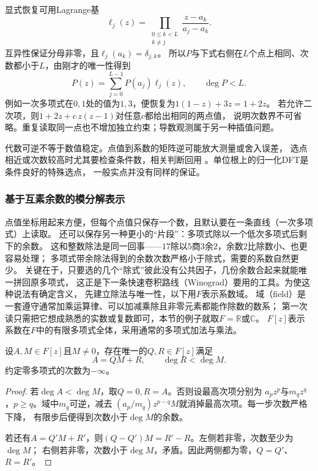 显式恢复可用Lagrange基
\[
  \ell_j(z)=\prod_{\substack{0\leq k<L\\k\neq j}}
  \frac{z-a_k}{a_j-a_k}.
\]
互异性保证分母非零，且$\ell_j(a_k)=\delta_{j,k}$。
所以$P$与下式右侧在$L$个点上相同、次数都小于$L$，由刚才的唯一性得到
\begin{equation}
  P(z)=\sum_{j=0}^{L-1}P(a_j)\ell_j(z),\qquad\deg P<L.
  \label{eq:signal-analysis-lagrange-interpolation}
\end{equation}
例如一次多项式在$0,1$处的值为$1,3$，便恢复为$1(1-z)+3z=1+2z$。
若允许二次项，则$1+2z+c\,z(z-1)$对任意$c$都给出相同的两点值，
说明次数界不可省略。重复读取同一点也不增加独立约束；导数观测属于另一种插值问题。

代数可逆不等于数值稳定。点值到系数的矩阵逆可能放大测量或舍入误差，
选点相近或次数较高时尤其要检查条件数，相关判断回用
。单位根上的归一化DFT是条件良好的特殊选点，
一般实点并没有同样的保证。

\subsubsection{基于互素余数的模分解表示}

点值坐标用起来方便，但每个点值只保存一个数，且默认要在一条直线（一次多项式）上读取。
还可以保存另一种更小的“片段”：多项式除以一个低次多项式后剩下的余数。
这和整数除法是同一回事——$17$除以$5$商$3$余$2$，余数$2$比除数小、也更容易处理；
多项式带余除法得到的余数次数严格小于除式，需要的系数自然更少。
关键在于，只要选的几个“除式”彼此没有公共因子，几份余数合起来就能唯一拼回原多项式，
这正是下一条快速卷积路线（Winograd）要用的工具。为使这种说法有确定含义，
先建立除法与唯一性，以下用$F$表示系数域。
域（field）是一套遵守通常加乘运算律、可以加减乘除且非零元素都能作除数的数系；
第一次读只需把它想成熟悉的实数或复数即可，本节的例子就取$F=\mathbb R$或$\mathbb C$。
$F[z]$表示系数在$F$中的有限多项式全体，采用通常的多项式加法与乘法。
\begin{theorem}[多项式带余除法]
  \label{thm:signal-analysis-polynomial-division}
  设$A,M\in F[z]$且$M\neq0$，存在唯一的$Q,R\in F[z]$满足
  \[
    A=QM+R,\qquad\deg R<\deg M.
  \]
  约定零多项式的次数为$-\infty$。
\end{theorem}
\begin{proof}
  若$\deg A<\deg M$，取$Q=0,R=A$。否则设最高次项分别为
  $a_pz^p$与$m_qz^q$，$p\geq q$。域中$m_q$可逆，减去
  $(a_p/m_q)z^{p-q}M$就消掉最高次项。每一步次数严格下降，
  有限步后便得到次数小于$\deg M$的余数。

  若还有$A=Q'M+R'$，则$(Q-Q')M=R'-R$。左侧若非零，次数至少为$\deg M$；
  右侧若非零，次数小于$\deg M$，矛盾。因此两侧都为零，$Q=Q'$、$R=R'$。
\end{proof}

